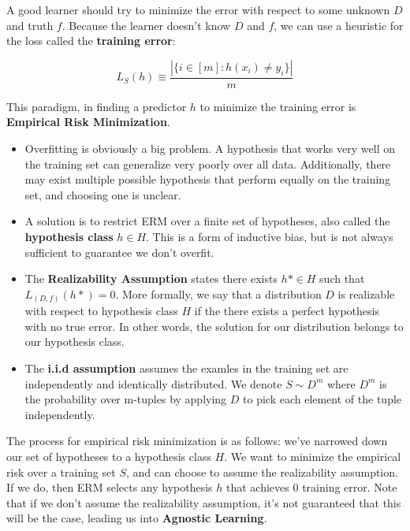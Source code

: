 \documentclass[11pt]{article}
\begin{document}
\noindent A good learner should try to minimize the error with respect to some unknown \( D \) and truth \( f \). Because the learner doesn't know \( D \) and \( f \),
we can use a heuristic for the loss called the \textbf{training error}:

\[ 
    L_{S}(h) \equiv \frac{|\{i \in [m] : h(x_{i}) \neq y_{i}\} |}{m} 
\]

\noindent This paradigm, in finding a predictor \( h \) to minimize the training error is \textbf{Empirical Risk Minimization}.


\begin{itemize}
    \item Overfitting is obviously a big problem. A hypothesis that works very well on the training set can generalize very poorly 
    over all data. Additionally, there may exist multiple possible hypothesis that perform equally on the training set, and choosing one is unclear.
    \item A solution is to restrict ERM over a finite set of hypotheses, also called the \textbf{hypothesis class} \( h \in H \). This is a form of 
    inductive bias, but is not always sufficient to guarantee we don't overfit. 
    \item The \textbf{Realizability Assumption} states there exists \( h* \in H \) such that \( L_{(D,f)}(h*) = 0 \). More formally, we say that a distribution \( D \)
    is realizable with respect to hypothesis class \( H \) if the there exists a perfect hypothesis with no true error. In other words, the solution for our distribution
    belongs to our hypothesis class.
    \item The \textbf{i.i.d assumption} assumes the examles in the training set are independently and identically distributed. We denote \( S \sim  D^{m} \)
    where \( D^{m} \) is the probability over m-tuples by applying \( D \) to pick each element of the tuple independently.
\end{itemize}

\noindent The process for empirical risk minimization is as follows: we've narrowed down our set of hypotheses to a hypothesis class \( H \). We want to minimize the empirical
risk over a training set \( S \), and can choose to assume the realizability assumption. If we do, then ERM selects any hypothesis \( h \) that achieves 0 training error. Note 
that if we don't assume the realizability assumption, it's not guaranteed that this will be the case, leading us into \textbf{Agnostic Learning}.
\\
\end{document}
